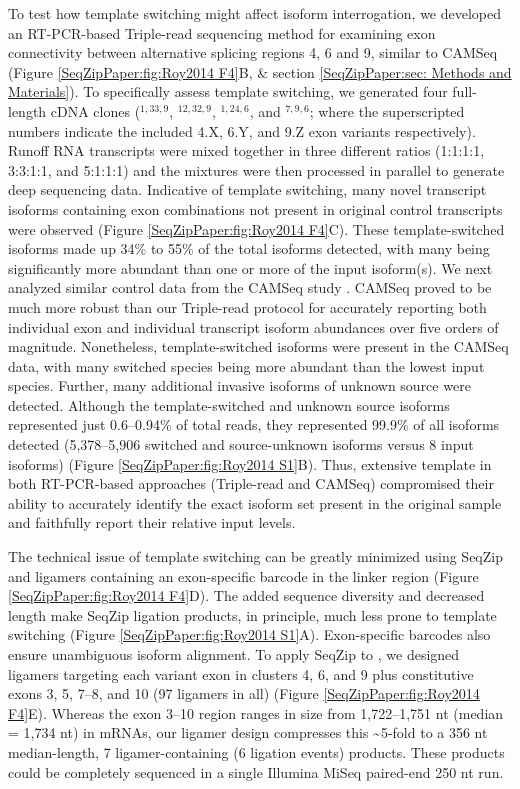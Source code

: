 		To test how template switching might affect \dscam{} isoform interrogation, we developed an RT-PCR-based Triple-read sequencing method for examining exon connectivity between alternative splicing regions 4, 6 and 9, similar to CAMSeq (Figure \ref{SeqZipPaper:fig:Roy2014 F4}B, \& section \ref{SeqZipPaper:sec: Methods and Materials}). To specifically assess template switching, we generated four full-length cDNA clones (\dscam{}$^{1,33,9}$, \dscam{}$^{12,32,9}$, \dscam{}$^{1,24,6}$, and \dscam$^{7,9,6}$; where the superscripted numbers indicate the included 4.X, 6.Y, and 9.Z exon variants respectively). Runoff RNA transcripts were mixed together in three different ratios (1:1:1:1, 3:3:1:1, and 5:1:1:1) and the mixtures were then processed in parallel to generate deep sequencing data. Indicative of template switching, many novel transcript isoforms containing exon combinations not present in original control transcripts were observed (Figure \ref{SeqZipPaper:fig:Roy2014 F4}C). These template-switched isoforms made up 34\% to 55\% of the total isoforms detected, with many being significantly more abundant than one or more of the input isoform(s). We next analyzed similar control data from the CAMSeq study \citep{Sun2013}. CAMSeq proved to be much more robust than our Triple-read protocol for accurately reporting both individual exon and individual transcript isoform abundances over five orders of magnitude. Nonetheless, template-switched isoforms were present in the CAMSeq data, with many switched species being more abundant than the lowest input species. Further, many additional invasive isoforms of unknown source were detected. Although the template-switched and unknown source isoforms represented just 0.6--0.94\% of total reads, they represented 99.9\% of all isoforms detected (5,378--5,906 switched and source-unknown isoforms versus 8 input isoforms) (Figure \ref{SeqZipPaper:fig:Roy2014 S1}B). Thus, extensive template in both RT-PCR-based approaches (Triple-read and CAMSeq) compromised their ability to accurately identify the exact isoform set present in the original sample and faithfully report their relative input levels.

		The technical issue of template switching can be greatly minimized using SeqZip and ligamers containing an exon-specific barcode in the linker region (Figure \ref{SeqZipPaper:fig:Roy2014 F4}D). The added sequence diversity and decreased length make SeqZip ligation products, in principle, much less prone to template switching (Figure \ref{SeqZipPaper:fig:Roy2014 S1}A). Exon-specific barcodes also ensure unambiguous isoform alignment. To apply SeqZip to \dscam{}, we designed ligamers targeting each variant exon in clusters 4, 6, and 9 plus constitutive exons 3, 5, 7--8, and 10 (97 ligamers in all) (Figure \ref{SeqZipPaper:fig:Roy2014 F4}E). Whereas the exon 3--10 region ranges in size from 1,722--1,751 nt (median = 1,734 nt) in \dscam{} mRNAs, our ligamer design compresses this \textasciitilde 5-fold to a 356 nt median-length, 7 ligamer-containing (6 ligation events) products. These products could be completely sequenced in a single Illumina MiSeq paired-end 250 nt run.

